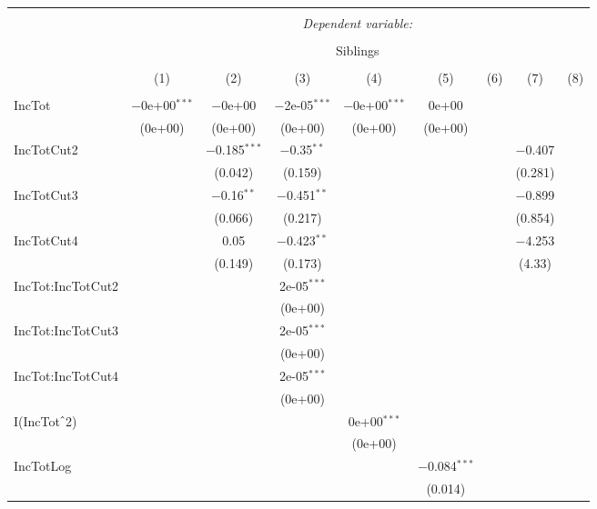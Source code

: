 
\begin{table}[!htbp] \centering 
  \caption{} 
  \label{} 
\begin{tabular}{@{\extracolsep{5pt}}lcccccccc} 
\\[-1.8ex]\hline 
\hline \\[-1.8ex] 
 & \multicolumn{8}{c}{\textit{Dependent variable:}} \\ 
\cline{2-9} 
\\[-1.8ex] & \multicolumn{8}{c}{Siblings} \\ 
\\[-1.8ex] & (1) & (2) & (3) & (4) & (5) & (6) & (7) & (8)\\ 
\hline \\[-1.8ex] 
 IncTot & $-$0e+00$^{***}$ & $-$0e+00 & $-$2e-05$^{***}$ & $-$0e+00$^{***}$ & 0e+00 &  &  &  \\ 
  & (0e+00) & (0e+00) & (0e+00) & (0e+00) & (0e+00) &  &  &  \\ 
  IncTotCut2 &  & $-$0.185$^{***}$ & $-$0.35$^{**}$ &  &  &  & $-$0.407 &  \\ 
  &  & (0.042) & (0.159) &  &  &  & (0.281) &  \\ 
  IncTotCut3 &  & $-$0.16$^{**}$ & $-$0.451$^{**}$ &  &  &  & $-$0.899 &  \\ 
  &  & (0.066) & (0.217) &  &  &  & (0.854) &  \\ 
  IncTotCut4 &  & 0.05 & $-$0.423$^{**}$ &  &  &  & $-$4.253 &  \\ 
  &  & (0.149) & (0.173) &  &  &  & (4.33) &  \\ 
  IncTot:IncTotCut2 &  &  & 2e-05$^{***}$ &  &  &  &  &  \\ 
  &  &  & (0e+00) &  &  &  &  &  \\ 
  IncTot:IncTotCut3 &  &  & 2e-05$^{***}$ &  &  &  &  &  \\ 
  &  &  & (0e+00) &  &  &  &  &  \\ 
  IncTot:IncTotCut4 &  &  & 2e-05$^{***}$ &  &  &  &  &  \\ 
  &  &  & (0e+00) &  &  &  &  &  \\ 
  I(IncTot$\hat{\mkern6mu}$2) &  &  &  & 0e+00$^{***}$ &  &  &  &  \\ 
  &  &  &  & (0e+00) &  &  &  &  \\ 
  IncTotLog &  &  &  &  & $-$0.084$^{***}$ &  &  &  \\ 
  &  &  &  &  & (0.014) &  &  &  \\ 

\end{tabular}
\end{table}

